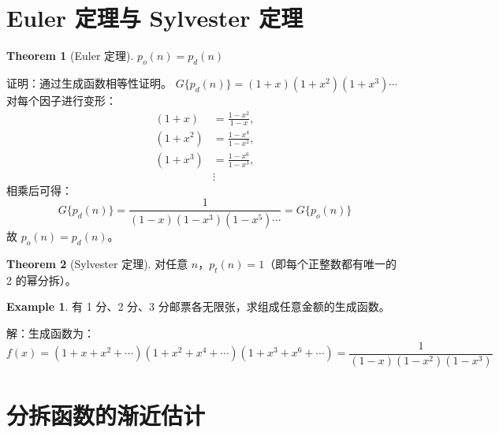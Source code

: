 \documentclass[oneside]{book}
\theoremstyle{definition}
\newtheorem{example}{Example}[section]
\newtheorem{theorem}{Theorem}[section]
\begin{document}
\section{Euler 定理与 Sylvester 定理}

\begin{theorem}[Euler 定理]
	\( p_o(n) = p_d(n) \)
	
	证明：通过生成函数相等性证明。
	\( G\{p_d(n)\} = (1+x)(1+x^2)(1+x^3)\cdots \)
	对每个因子进行变形：
	\[
	\begin{aligned}
		(1+x) &= \frac{1-x^2}{1-x}, \\
		(1+x^2) &= \frac{1-x^4}{1-x^2}, \\
		(1+x^3) &= \frac{1-x^6}{1-x^3}, \\
		&\vdots
	\end{aligned}
	\]
	相乘后可得：
	\[
	G\{p_d(n)\} = \frac{1}{(1-x)(1-x^3)(1-x^5)\cdots} = G\{p_o(n)\}
	\]
	故 \( p_o(n) = p_d(n) \)。
\end{theorem}

 \begin{theorem}[Sylvester 定理]
	对任意 \( n \)，\( p_t(n) = 1 \)（即每个正整数都有唯一的 2 的幂分拆）。
\end{theorem}


\begin{example}
	有 1 分、2 分、3 分邮票各无限张，求组成任意金额的生成函数。
	
	解：生成函数为：
	\[
	f(x) = (1+x+x^2+\cdots)(1+x^2+x^4+\cdots)(1+x^3+x^6+\cdots) = \frac{1}{(1-x)(1-x^2)(1-x^3)}
	\]
\end{example}

\section{分拆函数的渐近估计}
\end{document}

